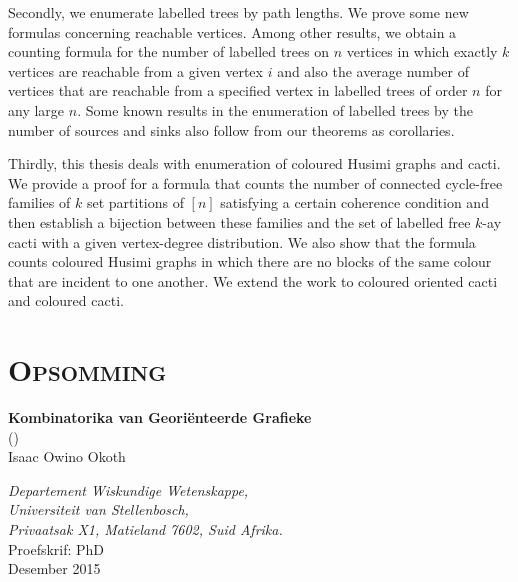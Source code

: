 Secondly, we enumerate labelled trees by path lengths. We prove some new formulas concerning reachable vertices. Among other results, we obtain a counting formula for the number of labelled trees on $n$ vertices in which exactly $k$ vertices are reachable from a given vertex $i$ and also the average number of vertices that are reachable from a specified vertex in labelled trees of order $n$ for any large $n.$ Some known results in the enumeration of labelled trees by the number of sources and sinks also follow from our theorems as corollaries.

Thirdly, this thesis deals with enumeration of coloured Husimi graphs and cacti. We provide a proof for a formula that counts the number of connected cycle-free families of $k$ set partitions of $[n]$ satisfying a certain coherence condition and then establish a bijection between these families  and the set of labelled free $k$-ay cacti with a given vertex-degree distribution. We also show that the formula counts coloured Husimi graphs in which there are no blocks of the same colour that are incident to one another. We extend the work to coloured oriented cacti and coloured cacti.

\chapter*{\huge\scshape  Opsomming} 
 \begin{center}
 {\large \textbf{Kombinatorika van Geori\"{e}nteerde Grafieke}}\\
 ()\\
 \vspace*{0.6cm}
 Isaac Owino Okoth
 
 \emph{Departement Wiskundige Wetenskappe,\\
 Universiteit van Stellenbosch,\\
 Privaatsak X1, Matieland 7602, Suid Afrika.}\\
  \vspace*{0.6cm}
 Proefskrif: PhD\\
  \vspace*{0.2cm}
  Desember 2015 
  \end{center}


